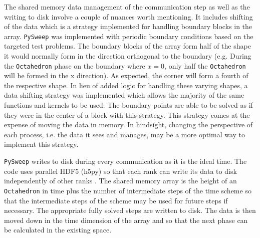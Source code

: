 \documentclass[review]{elsarticle}
\def\pysweep{\texttt{PySweep}}
\def\Oct{\texttt{Octahedron}}
\begin{document}
\par The shared memory data management of the communication step as well as the writing to disk involve a couple of nuances worth mentioning. It includes shifting of the data which is a strategy implemented for handling boundary blocks in the array. \pysweep{} was implemented with periodic boundary conditions based on the targeted test problems. The boundary blocks of the array form half of the shape it would normally form in the direction orthogonal to the boundary (e.g. During the \Oct{} phase on the boundary where $x=0$, only half the \Oct{} will be formed in the x direction). As expected, the corner will form a fourth of the respective shape. In lieu of added logic for handling these varying shapes, a data shifting strategy was implemented which allows the majority of the same functions and kernels to be used. The boundary points are able to be solved as if they were in the center of a block with this strategy. This strategy comes at the expense of moving the data in memory. In hindsight, changing the perspective of each process, i.e. the data it sees and manages, may be a more optimal way to implement this strategy.

\par \pysweep{} writes to disk during every communication as it is the ideal time. The code uses parallel HDF5 (h5py) so that each rank can write its data to disk independently of other ranks \cite{Collette2008HDF5Python}. The shared memory array is the height of an \Oct{} in time plus the number of intermediate steps of the time scheme so that the intermediate steps of the scheme may be used for future steps if necessary. The appropriate fully solved steps are written to disk. The data is then moved down in the time dimension of the array and so that the next phase can be calculated in the existing space.
\end{document}
